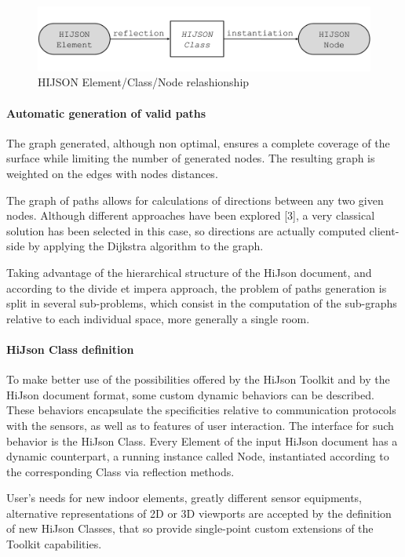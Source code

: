 \documentclass{sig-alternate}
\begin{document}
\begin{figure}[!h]
\centering
\includegraphics[width=.8\linewidth]{../images/element-class-node}
\caption{HIJSON Element/Class/Node relashionship}
\label{fig:elem-class-node-rel}
\end{figure}


\paragraph{Automatic generation of valid paths}

The graph generated, although non optimal, ensures a complete coverage of the surface while limiting the number of generated nodes. The resulting graph is weighted on the edges with nodes distances. 

The graph of paths allows for calculations of directions between any two given nodes. Although different approaches have been explored [3], a very classical solution has been selected in this case, so directions are actually computed client-side by applying the Dijkstra algorithm to the graph.

Taking advantage of the hierarchical structure of the HiJson document, and according to the divide et impera approach, the problem of paths generation is split in several sub-problems, which consist in the computation of the sub-graphs relative to each individual space, more generally a single room. 

\paragraph{HiJson Class definition}

To make better use of the possibilities offered by the HiJson Toolkit and by the HiJson document format, some custom dynamic behaviors can be described. These behaviors encapsulate the specificities relative to communication protocols with the sensors, as well as to features of user interaction. The interface for such behavior is the HiJson Class.
Every Element of the input HiJson document has a dynamic counterpart, a running instance called  Node, instantiated according to the corresponding Class via reflection methods.


User's needs for new indoor elements, greatly different sensor equipments, alternative representations of 2D or 3D viewports are accepted by the definition of new HiJson Classes, that so provide single-point custom extensions of the Toolkit capabilities.
\end{document}
